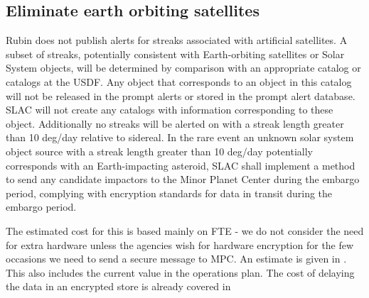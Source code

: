 
\subsection{Eliminate earth orbiting satellites} \label{sec:4eliminate}

Rubin does not publish alerts for streaks associated with artificial satellites.
A subset of streaks, potentially consistent with Earth-orbiting satellites or Solar System objects,
will be determined by comparison with an appropriate catalog or catalogs at the \gls{USDF}.
Any object that corresponds to an object in this catalog will not be released in the  prompt
alerts or stored in the prompt alert database.
SLAC will not create any catalogs with information corresponding to these object.
Additionally no streaks will be  alerted on with a streak length greater than 10 deg/day relative to sidereal.
In the rare event an unknown solar system object source with a streak  length greater than 10 deg/day potentially corresponds with an Earth-impacting asteroid, SLAC shall implement a method to send any candidate  impactors to the Minor Planet Center during the embargo period, complying with encryption standards for data in transit during the embargo  period.

The estimated cost for this is based mainly on FTE - we do not consider the need for extra hardware unless the agencies wish for hardware encryption for the few occasions we need to send a secure message to \gls{MPC}.
An estimate is given in . This also includes the current value in the operations plan.
The cost of delaying the data in an encrypted store is already covered in 




